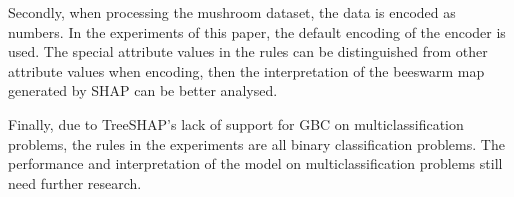 \documentclass[runningheads,a4paper]{llncs}
\begin{document}
Secondly, when processing the mushroom dataset, the data is encoded as numbers. In the experiments of this paper, the default encoding of the encoder is used. The special attribute values in the rules can be distinguished from other attribute values when encoding, then the interpretation of the beeswarm map generated by SHAP can be better analysed.

Finally, due to TreeSHAP's lack of support for GBC on multiclassification problems, the rules in the experiments are all binary classification problems. The performance and interpretation of the model on multiclassification problems still need further research.




\end{document}
